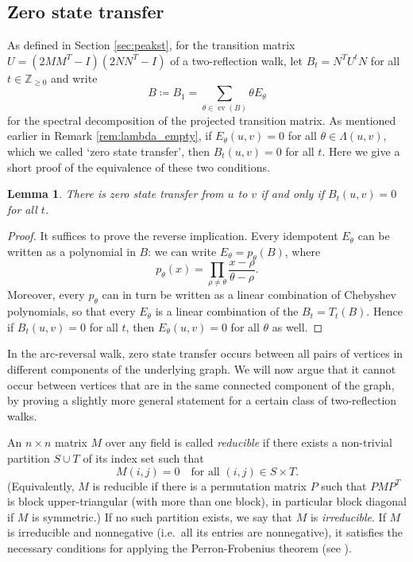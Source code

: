 \documentclass{article}
\newtheorem{lemma}[theorem]{Lemma}
\numberwithin{equation}{section}
\DeclareMathOperator\ev{ev}
\newcommand\ints{{\mathbb Z}}
\begin{document}
\subsection{Zero state transfer}\label{subsec:no-st}

As defined in Section \ref{sec:peakst}, for the transition matrix $U = (2MM^T - I)(2NN^T - I)$ of a two-reflection walk, let $B_t = N^T U^t N$ for all $t \in \ints_{\geq 0}$ and write 
\[
B \coloneq B_1 = \sum_{\theta \in \ev(B)} \theta E_\theta
\]
for the spectral decomposition of the projected transition matrix. As mentioned earlier in Remark \ref{rem:lambda_empty}, if $E_\theta(u,v) = 0$ for all $\theta \in \Lambda(u,v)$, which we called `zero state transfer', then $B_t(u,v) = 0$ for all $t$. Here we give a short proof of the equivalence of these two conditions.
\begin{lemma}
\label{lem:zero_state_transfer}
There is zero state transfer from $u$ to $v$ if and only if $B_t(u,v) = 0$ for all $t$.
\end{lemma}
\begin{proof}
It suffices to prove the reverse implication. Every idempotent $E_\theta$ can be written as a polynomial in $B$: we can write $E_\theta = p_\theta(B)$, where
\[
p_\theta(x) = \prod_{\rho \neq \theta}\frac{x - \rho}{\theta - \rho}.
\]
Moreover, every $p_\theta$ can in turn be written as a linear combination of Chebyshev polynomials, so that every $E_\theta$ is a linear combination of the $B_t = T_t(B)$. Hence if $B_t(u,v) = 0$ for all $t$, then $E_\theta(u,v) = 0$ for all $\theta$ as well.
\end{proof}

In the arc-reversal walk, zero state transfer occurs between all pairs of vertices in different components of the underlying graph. We will now argue that it cannot occur between vertices that are in the same connected component of the graph, by proving a slightly more general statement for a certain class of two-reflection walks.

An $n \times n$ matrix $M$ over any field is called \textsl{reducible} if there exists a non-trivial partition $S \cup T$ of its index set such that
\begin{equation}
\label{eq:reducible_partition}
M(i,j) = 0 \quad \text{for all $(i,j) \in S \times T$}.
\end{equation}
(Equivalently, $M$ is reducible if there is a permutation matrix $P$ such that $PMP^T$ is block upper-triangular (with more than one block), in particular block diagonal if $M$ is symmetric.) If no such partition exists, we say that $M$ is \textsl{irreducible}. If $M$ is irreducible and nonnegative (i.e.\ all its entries are nonnegative), it satisfies the necessary conditions for applying the Perron-Frobenius theorem (see \cite{BroHae2012}).
\end{document}
